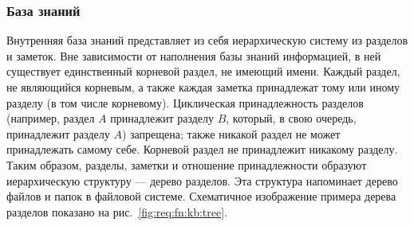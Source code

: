     \subsubsection{База знаний}
        \label{sec:req:fn:kb}
        Внутренняя база знаний представляет из себя иерархическую систему из разделов
        и заметок. Вне зависимости от наполнения базы знаний информацией, в ней существует единственный
        корневой раздел, не имеющий имени. Каждый раздел, не являющийся корневым, а также
        каждая заметка принадлежат тому или иному разделу (в том числе корневому). Циклическая
        принадлежность разделов (например, раздел \(A\) принадлежит разделу \(B\), который, в свою
        очередь, принадлежит разделу \(A\)) запрещена; также никакой раздел не может принадлежать самому
        себе. Корневой раздел не принадлежит никакому разделу. Таким образом, разделы, заметки и отношение
        принадлежности образуют иерархическую структуру --- дерево разделов. Эта структура напоминает
        дерево файлов и папок в файловой системе. Схематичное изображение примера дерева разделов
        показано на рис.~\ref{fig:req:fn:kb:tree}.
